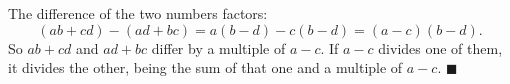 The difference of the two numbers factors:
\[(ab+cd)-(ad+bc)=a(b-d)-c(b-d)=(a-c)(b-d).\]
So $ab+cd$ and $ad+bc$ differ by a multiple of $a-c$. If $a-c$ divides one of them, it divides the other, being the sum of that one and a multiple of $a-c$. $\blacksquare$
